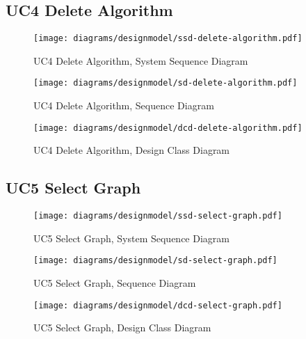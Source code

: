 \subsection{UC4 Delete Algorithm}
\begin{figure}[H]
    \centering
    \texttt{[image: diagrams/designmodel/ssd-delete-algorithm.pdf]}
    \caption{UC4 Delete Algorithm, System Sequence Diagram}
    \label{fig:delete-algorithm-ssd}
\end{figure}
\begin{figure}[H]
    \centering
    \texttt{[image: diagrams/designmodel/sd-delete-algorithm.pdf]}
    \caption{UC4 Delete Algorithm, Sequence Diagram}
    \label{fig:delete-algorithm-sd}
\end{figure}
\begin{figure}[H]
    \centering
    \texttt{[image: diagrams/designmodel/dcd-delete-algorithm.pdf]}
    \caption{UC4 Delete Algorithm, Design Class Diagram}
    \label{fig:delete-algorithm-dcd}
\end{figure}
% 
\subsection{UC5 Select Graph}
\begin{figure}[H]
    \centering
    \texttt{[image: diagrams/designmodel/ssd-select-graph.pdf]}
    \caption{UC5 Select Graph, System Sequence Diagram}
    \label{fig:select-graph-ssd}
\end{figure}
\begin{figure}[H]
    \centering
    \texttt{[image: diagrams/designmodel/sd-select-graph.pdf]}
    \caption{UC5 Select Graph, Sequence Diagram}
    \label{fig:select-graph-sd}
\end{figure}
\begin{figure}[H]
    \centering
    \texttt{[image: diagrams/designmodel/dcd-select-graph.pdf]}
    \caption{UC5 Select Graph, Design Class Diagram}
    \label{fig:select-graph-dcd}
\end{figure}
% 
